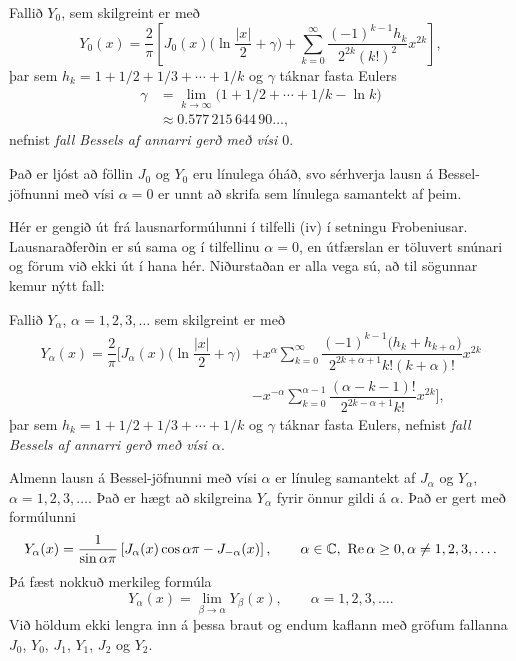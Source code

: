 \begin{sk}  Fallið $Y_0$, sem skilgreint er með 
\begin{equation*}
Y_0(x)=\dfrac 2{\pi}\left[J_0(x)\bigg(\ln \dfrac {|x|}2+{\gamma}\bigg)
+\sum\limits_{k=0}^{\infty}
\dfrac{(-1)^{k-1}h_k}{2^{2k}(k!)^2} x^{2k}\right],\label{3.5.7}
\end{equation*}
þar sem $h_k=1+1/2+1/3+\cdots+1/k$ og ${\gamma}$ táknar fasta
Eulers
\begin{align*}
{\gamma}&=\lim\limits_{k\to {\infty}} \big(1+1/2+\cdots+1/k-\ln k\big)
\\
&\approx 0.577 \,  215 \,  644 \, 90 \dots,\nonumber
\end{align*}
nefnist {\it fall Bessels af annarri gerð með vísi $0$}.
\end{sk}

Það er ljóst að föllin $J_0$ og $Y_0$ eru línulega óháð, svo sérhverja
lausn á Bessel-jöfnunni með vísi ${\alpha}=0$ er unnt að skrifa sem
línulega samantekt af þeim. 


Hér er gengið út frá lausnarformúlunni í tilfelli (iv) í setningu
Frobeniusar.  Lausnaraðferðin er sú sama og í tilfellinu ${\alpha}=0$,
en útfærslan er töluvert snúnari og förum við ekki út í hana hér. 
Niðurstaðan er alla vega sú, að  til sögunnar kemur nýtt fall:


\begin{sk}  Fallið $Y_{\alpha}$, ${\alpha}=1,2,3,\dots$ sem skilgreint er með 
\begin{align*}
Y_{\alpha}(x)=\dfrac 2{\pi}\bigg[
J_{\alpha}(x)\bigg(\ln \dfrac {|x|}2+{\gamma}\bigg)
&+x^{\alpha}\sum\limits_{k=0}^{\infty}
\dfrac{(-1)^{k-1}\big(h_k+h_{k+\alpha}\big)}
{2^{2k+\alpha+1}k!(k+{\alpha})!} x^{2k}\label{3.5.9}\\
&-x^{-\alpha}\sum\limits_{k=0}^{\alpha-1}
\dfrac{(\alpha-k-1)!}{2^{2k-\alpha+1}k!}x^{2k}\bigg],\nonumber
\end{align*}
þar sem $h_k=1+1/2+1/3+\cdots+1/k$  og ${\gamma}$ táknar fasta
Eulers,
nefnist {\it fall Bessels af annarri gerð með vísi ${\alpha}$}.
\end{sk}


Almenn lausn á Bessel-jöfnunni með vísi ${\alpha}$ er línuleg samantekt
af $J_{\alpha}$ og $Y_{\alpha}$, ${\alpha}=1,2,3,\dots$. Það er hægt að
skilgreina $Y_{\alpha}$ fyrir önnur gildi á ${\alpha}$.  Það er
gert með formúlunni
$$
Y_{\alpha}(x)=\dfrac 1{\sin {\alpha}{\pi}}\left[
J_{\alpha}(x)\cos{\alpha}{\pi} -J_{-{\alpha}}(x)
\right], \qquad {\alpha}\in {\mathbb C}, \ {\operatorname{Re\, }} {\alpha}\geq 0, {\alpha}\neq
1,2,3,\dots. 
$$
Þá fæst nokkuð merkileg formúla
$$
Y_{\alpha}(x)=\lim_{{\beta}\to {\alpha}} Y_{\beta}(x), \qquad 
{\alpha}=1,2,3,\dots .
$$
Við  höldum ekki lengra inn á þessa braut og endum kaflann
 með gröfum fallanna 
$J_0$, $Y_0$, $J_1$, $Y_1$, $J_2$ og  $Y_2$. 





